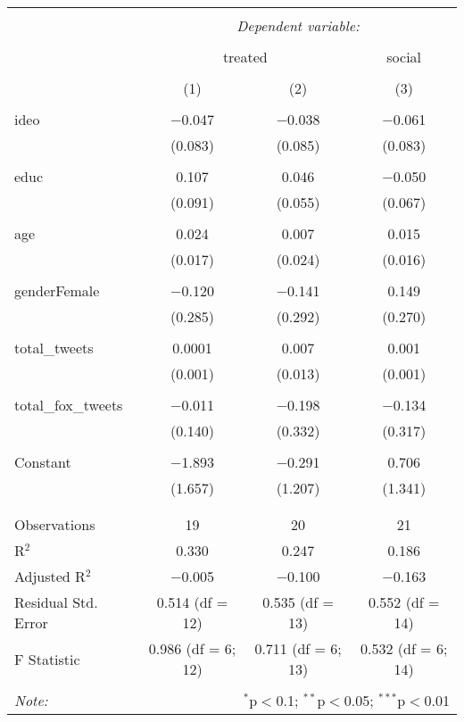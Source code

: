 
\begin{table}[!htbp] \centering 
  \caption{} 
  \label{} 
\begin{tabular}{@{\extracolsep{5pt}}lccc} 
\\[-1.8ex]\hline 
\hline \\[-1.8ex] 
 & \multicolumn{3}{c}{\textit{Dependent variable:}} \\ 
\cline{2-4} 
\\[-1.8ex] & \multicolumn{2}{c}{treated} & social \\ 
\\[-1.8ex] & (1) & (2) & (3)\\ 
\hline \\[-1.8ex] 
 ideo & $-$0.047 & $-$0.038 & $-$0.061 \\ 
  & (0.083) & (0.085) & (0.083) \\ 
  & & & \\ 
 educ & 0.107 & 0.046 & $-$0.050 \\ 
  & (0.091) & (0.055) & (0.067) \\ 
  & & & \\ 
 age & 0.024 & 0.007 & 0.015 \\ 
  & (0.017) & (0.024) & (0.016) \\ 
  & & & \\ 
 genderFemale & $-$0.120 & $-$0.141 & 0.149 \\ 
  & (0.285) & (0.292) & (0.270) \\ 
  & & & \\ 
 total\_tweets & 0.0001 & 0.007 & 0.001 \\ 
  & (0.001) & (0.013) & (0.001) \\ 
  & & & \\ 
 total\_fox\_tweets & $-$0.011 & $-$0.198 & $-$0.134 \\ 
  & (0.140) & (0.332) & (0.317) \\ 
  & & & \\ 
 Constant & $-$1.893 & $-$0.291 & 0.706 \\ 
  & (1.657) & (1.207) & (1.341) \\ 
  & & & \\ 
\hline \\[-1.8ex] 
Observations & 19 & 20 & 21 \\ 
R$^{2}$ & 0.330 & 0.247 & 0.186 \\ 
Adjusted R$^{2}$ & $-$0.005 & $-$0.100 & $-$0.163 \\ 
Residual Std. Error & 0.514 (df = 12) & 0.535 (df = 13) & 0.552 (df = 14) \\ 
F Statistic & 0.986 (df = 6; 12) & 0.711 (df = 6; 13) & 0.532 (df = 6; 14) \\ 
\hline 
\hline \\[-1.8ex] 
\textit{Note:}  & \multicolumn{3}{r}{$^{*}$p$<$0.1; $^{**}$p$<$0.05; $^{***}$p$<$0.01} \\ 
\end{tabular} 
\end{table} 
